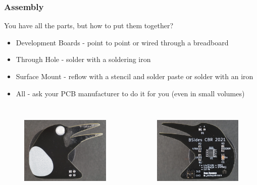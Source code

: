\documentclass[aspectratio=169, t]{beamer}
\begin{document}
\begin{frame}
\frametitle{Assembly}
You have all the parts, but how to put them together?
\begin{itemize}
	\item Development Boards - point to point or wired through a breadboard
	\item Through Hole - solder with a soldering iron
	\item Surface Mount - reflow with a stencil and solder paste or solder with an iron
	\item All - ask your PCB manufacturer to do it for you (even in small volumes)
\end{itemize}
\vspace{-5mm}
\begin{columns}
	\begin{figure}
		\includegraphics[height=4cm]{images/magpie-front.JPG}
	\end{figure}
	\begin{figure}
		\includegraphics[height=4cm]{images/magpie-back.JPG}
	\end{figure}
\end{columns}
\end{frame}
\end{document}
